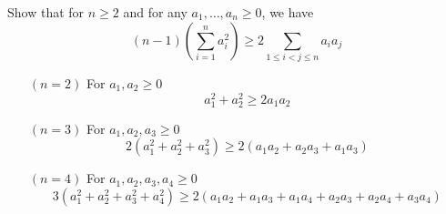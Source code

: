 \vspace*{1em}

\begin{example}
Show that for $n \geq 2$ and for any $a_1,\ldots,a_n \geq 0$, we have
\[(n-1)\left(\sum_{i=1}^n a_i^2 \right) \geq 2 \sum_{1\leq i < j \leq n}a_ia_j\]
\begin{itemize}[leftmargin=4em]
\item[$(n=2)$] For $a_1,a_2 \geq 0$
\[a_1^2 + a_2^2 \geq 2a_1a_2\]
\item[$(n=3)$] For $a_1,a_2,a_3 \geq 0$
\[2(a_1^2 + a_2^2 + a_3^2) \geq 2(a_1a_2 + a_2a_3 + a_1a_3)\]
\item[$(n=4)$] For $a_1,a_2,a_3,a_4 \geq 0$
\[3(a_1^2 + a_2^2 + a_3^2 + a_4^2) \geq 2(a_1a_2 + a_1a_3 + a_1a_4 + a_2a_3 + a_2a_4 + a_3a_4)\]
\end{itemize}
\end{example}
